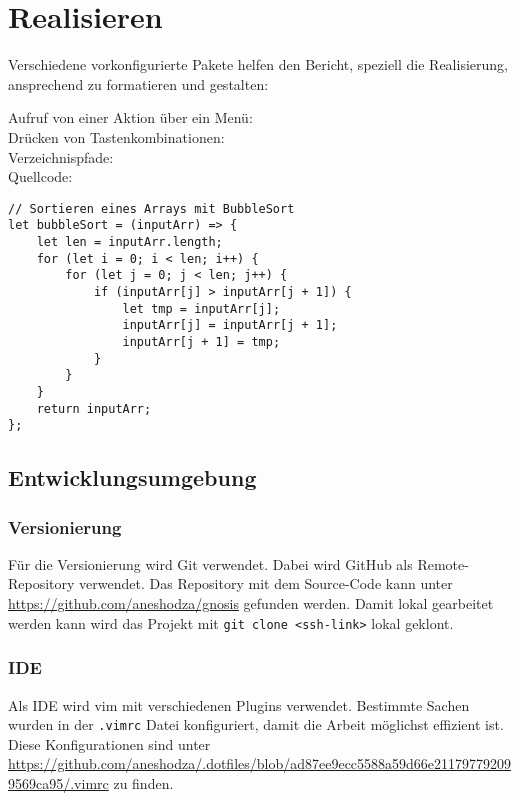 \chapter{Realisieren}

Verschiedene vorkonfigurierte Pakete helfen den Bericht, speziell die Realisierung, ansprechend zu formatieren und gestalten:

Aufruf von einer Aktion über ein Menü:
 \\
Drücken von Tastenkombinationen:
 \\
Verzeichnispfade:
 \\
Quellcode:

\begin{codebox}[]
  \begin{verbatim}
// Sortieren eines Arrays mit BubbleSort
let bubbleSort = (inputArr) => {
    let len = inputArr.length;
    for (let i = 0; i < len; i++) {
        for (let j = 0; j < len; j++) {
            if (inputArr[j] > inputArr[j + 1]) {
                let tmp = inputArr[j];
                inputArr[j] = inputArr[j + 1];
                inputArr[j + 1] = tmp;
            }
        }
    }
    return inputArr;
};
  \end{verbatim}
\end{codebox}

\section{Entwicklungsumgebung}
\subsection{Versionierung}
Für die Versionierung wird Git verwendet. Dabei wird GitHub als Remote-Repository verwendet. Das Repository mit
dem Source-Code kann unter \url{https://github.com/aneshodza/gnosis} gefunden werden. \newline
Damit lokal gearbeitet werden kann wird das Projekt mit \texttt{git clone <ssh-link>} lokal geklont.

\subsection{IDE}
Als IDE wird vim mit verschiedenen Plugins verwendet. Bestimmte Sachen wurden in der \texttt{.vimrc} Datei
konfiguriert, damit die Arbeit möglichst effizient ist. \newline
Diese Konfigurationen sind unter \newline
\url{https://github.com/aneshodza/.dotfiles/blob/ad87ee9ecc5588a59d66e211797792099569ca95/.vimrc} zu finden.

